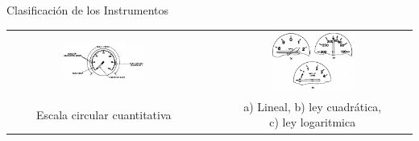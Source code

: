 \documentclass[10pt]{beamer}
\begin{document}
\begin{frame}{Clasificaci\'on de los Instrumentos}

  \begin{tabular}{ccc}
    \includegraphics[width=0.45\textwidth]{imagenes/1.2.clasificacion.instrumentos/escala_circular_cuantitativa.png} & \hspace{3mm}
&     \includegraphics[width=0.45\textwidth]{imagenes/1.2.clasificacion.instrumentos/escala_circular_lineal_no_lineal.png}
\\
	Escala circular cuantitativa & 
& \parbox{0.45\textwidth}{a) Lineal, b) ley cuadr\'atica, \\c) ley logaritmica}
\\
  \end{tabular}

\end{frame}
\end{document}
